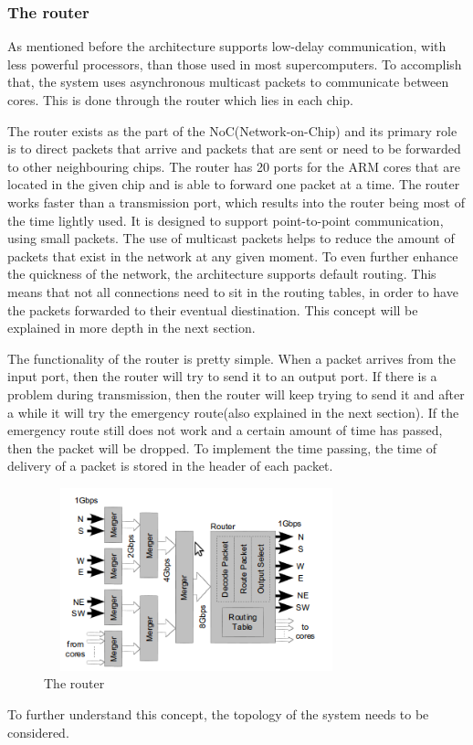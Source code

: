\documentclass[12pt,a4paper]{article}
\begin{document}
\subsubsection{The router}
As mentioned before the architecture supports low-delay communication, with less powerful processors, than those used in most supercomputers. To accomplish that, the system uses asynchronous multicast packets to communicate between cores. This is done through the router which lies in each chip.

The router exists as the part of the NoC(Network-on-Chip) and its primary role is to direct packets that arrive and packets that are sent or need to be forwarded to other neighbouring chips. The router has 20 ports for the ARM cores that are located in the given chip and is able to forward one packet at a time. The router works faster than a transmission port, which results into the router being most of the time lightly used. It is designed to support point-to-point communication, using small packets. The use of multicast packets helps to reduce the amount of packets that exist in the network at any given moment. To even further enhance the quickness of the network, the architecture supports default routing. This means that not all connections need to sit in the routing tables, in order to have the packets forwarded to their eventual diestination. This concept will be explained in more depth in the next section.

The functionality of the router is pretty simple. When a packet arrives from the input port, then the router will try to send it to an output port. If there is a problem during transmission, then the router will keep trying to send it and after a while it will try the emergency route(also explained in the next section). If the emergency route still does not work and a certain amount of time has passed, then the packet will be dropped. To implement the time passing, the time of delivery of a packet is stored in the header of each packet.

\begin{figure}[h!]
\includegraphics[width=250pt,height=150pt,scale=2]{Pics/router.png}
\centering
\caption{The router\cite{navaridas2009understanding}}
\end{figure}
To further understand this concept, the topology of the system needs to be considered.
\end{document}
